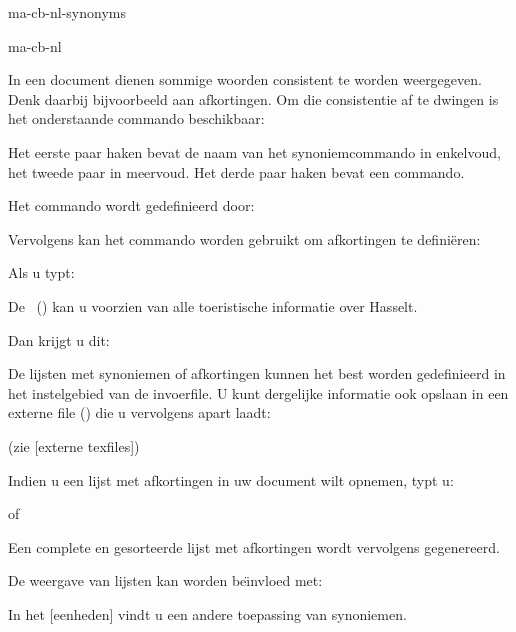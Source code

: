 \startonderdeel ma-cb-nl-synonyms

\produkt ma-cb-nl




In een document dienen sommige woorden consistent te worden
weergegeven. Denk daarbij bijvoorbeeld aan afkortingen. Om
die consistentie af te dwingen is het onderstaande commando
beschikbaar:


Het eerste paar haken bevat de naam van het synoniemcommando
in enkelvoud, het tweede paar in meervoud. Het derde paar
haken bevat een commando.

Het commando \type{\afkortingen} wordt gedefinieerd door:

\starttypen
{}
\stelsynoniemenin[letter=kap]
\stoptypen

Vervolgens kan het commando \type{\afkorting} worden gebruikt
om afkortingen te defini\"eren:

\starttypen
{}
\stoptypen


Als u typt:

\startbuffer
De \VVV\ () kan u voorzien van alle toeristische
informatie over Hasselt.
\stopbuffer

\typebuffer

Dan krijgt u dit:

\haalbuffer

De lijsten met synoniemen of afkortingen kunnen het best
worden gedefinieerd in het instelgebied van de invoerfile. U
kunt dergelijke informatie ook opslaan in een externe file
() die u vervolgens apart laadt:

\type{} \quad \quad (zie [externe texfiles])

Indien u een lijst met afkortingen in uw document wilt
opnemen, typt u:

\starttypen
\plaatslijstmetafkortingen
\stoptypen

of

\starttypen
\volledigelijstmetafkortingen
\stoptypen

Een complete en gesorteerde lijst met afkortingen wordt
vervolgens gegenereerd.

De weergave van lijsten kan worden be\"{\i}nvloed met:

\starttypen
\stelsynoniemenin
\stoptypen

In het [eenheden] vindt u een andere
toepassing van synoniemen.

\stoponderdeel
